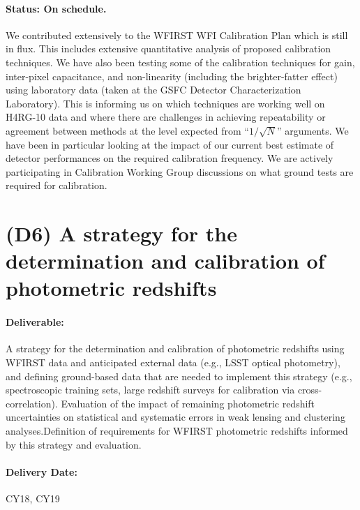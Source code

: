 \paragraph*{Status: On schedule.} We contributed extensively to the WFIRST WFI Calibration Plan which is still in flux. This includes extensive quantitative analysis of proposed calibration techniques. We have also been testing some of the calibration techniques for gain, inter-pixel capacitance, and non-linearity (including the brighter-fatter effect) using laboratory data (taken at the GSFC Detector Characterization Laboratory). This is informing us on which techniques are working well on H4RG-10 data and where there are challenges in achieving repeatability or agreement between methods at the level expected from ``$1/\sqrt N$'' arguments. We have been in particular looking at the impact of our current best estimate of detector performances on the required calibration frequency. We are actively participating in Calibration Working Group discussions on what ground tests are required for calibration.


\section*{(D6) A strategy for the determination and calibration of photometric redshifts}

\paragraph*{Deliverable:} A strategy for the determination and calibration of
photometric redshifts using WFIRST data and anticipated external data (e.g.,
LSST optical photometry), and defining ground-based data that are needed to
implement this strategy (e.g., spectroscopic training sets, large redshift
surveys for calibration via cross-correlation). Evaluation of the impact of
remaining photometric redshift uncertainties on statistical and systematic
errors in weak lensing and clustering analyses.Definition of requirements for
WFIRST photometric redshifts informed by this strategy and evaluation.

\paragraph*{Delivery Date:} CY18, CY19

